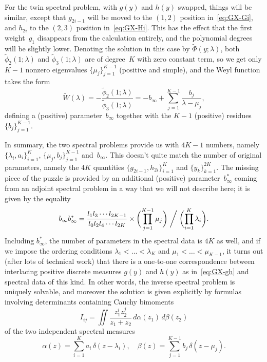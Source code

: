 \documentclass[10pt,a4paper]{article} \pdfoutput=1 
\begin{document}
For the twin spectral problem, with $g(y)$ and $h(y)$ swapped,
things will be similar, except that $g_{2i-1}$ will be moved to the $(1,2)$ position in~\eqref{eq:GX-Gi},
and $h_{2i}$ to the $(2,3)$ position in~\eqref{eq:GX-Hi}.
This has the effect that the first weight~$g_1$ disappears from the calculation entirely,
and the polynomial degrees will be slightly lower.
Denoting the solution in this case by $\widetilde \Phi(y;\lambda)$,
both $\widetilde \phi_2(1;\lambda)$ and $\widetilde \phi_3(1;\lambda)$
are of degree~$K$ with zero constant term,
so we get only $K-1$ nonzero eigenvalues $\{ \mu_j \}_{j=1}^{K-1}$ (positive and simple),
and the Weyl function takes the form
\begin{equation}
  \widetilde W(\lambda)
  = - \frac{\widetilde \phi_2(1;\lambda)}{\widetilde \phi_3(1;\lambda)}
  = - b_\infty + \sum_{j=1}^{K-1} \frac{b_j}{\lambda-\mu_j}
  ,
\end{equation}
defining a (positive) parameter~$b_\infty$
together with the $K-1$ (positive) residues $\{ b_j \}_{j=1}^{K-1}$.

In summary, the two spectral problems provide us with $4K-1$ numbers,
namely
$\{ \lambda_i, a_i \}_{i=1}^K$,
$\{ \mu_j, b_j \}_{j=1}^{K-1}$
and~$b_\infty$.
This doesn't quite match the number of original parameters,
namely the $4K$ quantities $\{ g_{2i-1}, h_{2i} \}_{i=1}^K$ and $\{ y_k \}_{k=1}^{2K}$.
The missing piece of the puzzle is provided by an additional (positive) parameter~$b_\infty^*$
coming from an adjoint spectral problem in a way that we will not describe here;
it is given by the equality
\begin{equation}
  \label{eq:GX-b-infty-b-infty-star-product}
  b_{\infty} b^*_{\infty}
  = \frac{l_1 l_3 \dotsm l_{2K-1}}{l_0 l_2 l_4 \dotsm l_{2K}}
  \times \biggl( \prod_{j=1}^{K-1} \mu_j \biggr) \biggm/ \biggl( \prod_{i=1}^{K} \lambda_i \biggr)
  .
\end{equation}
Including $b_\infty^*$, the number of parameters in the spectral data is $4K$ as well,
and if we impose the ordering conditions $\lambda_1 < \dots < \lambda_K$
and $\mu_1 < \dots < \mu_{K-1}$,
it turns out (after lots of technical work) that
there is a one-to-one correspondence between interlacing positive discrete
measures $g(y)$ and $h(y)$ as in~\eqref{eq:GX-gh}
and spectral data of this kind.
In other words, the inverse spectral problem is uniquely solvable,
and moreover the solution is given explicitly by formulas involving determinants
containing Cauchy bimoments
\begin{equation}
  I_{ij} = \iint \frac{z_1^i z_2^j}{z_1+z_2} \, d\alpha(z_1) \, d\beta(z_2)
\end{equation}
of the two independent spectral measures
\begin{equation}
  \label{eq:spectral-measures}
  \alpha(z) = \sum_{i=1}^K a_i \, \delta(z-\lambda_i)
  , \quad
  \beta(z) = \sum_{j=1}^{K-1} b_j \, \delta(z-\mu_j)
  .
\end{equation}
\end{document}

